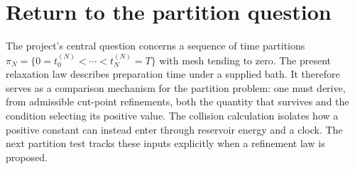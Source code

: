 \documentclass[11pt,a4paper]{article}
\begin{document}
\section{Return to the partition question}
The project's central question concerns a sequence of time partitions
$\pi_N=\{0=t_0^{(N)}<\cdots<t_N^{(N)}=T\}$ with mesh tending to zero.
The present relaxation law describes preparation time under a supplied bath.
It therefore serves as a comparison mechanism for the partition problem:
one must derive, from admissible cut-point refinements, both the quantity
that survives and the condition selecting its positive value. The collision
calculation isolates how a positive constant can instead enter through
reservoir energy and a clock. The next partition test tracks these inputs
explicitly when a refinement law is proposed.



\end{document}
